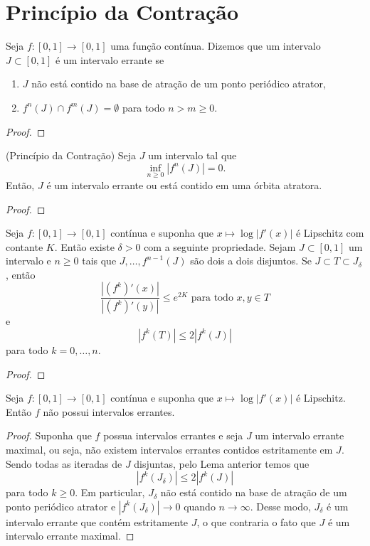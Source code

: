 \section{Princípio da Contração}

\begin{definition}
Seja $f: [0,1] \to [0,1]$ uma função contínua. Dizemos que um intervalo $J \subset [0,1]$ é um intervalo errante se
\begin{enumerate}
\item $J$ não está contido na base de atração de um ponto periódico atrator,
\item $f^n(J) \cap f^m(J) = \emptyset$ para todo $n > m \geq 0$.
\end{enumerate}

\begin{proof}

\end{proof}

\begin{lemma}(Princípio da Contração)
Seja $J$ um intervalo tal que
$$\inf_{n \geq 0} |f^n(J)| = 0.$$
Então, $J$ é um intervalo errante ou está contido em uma órbita atratora.
\end{lemma}

\begin{proof}

\end{proof}

\begin{lemma}
Seja $f: [0,1] \to [0,1]$ contínua e suponha que $x \mapsto \log |f'(x)|$ é Lipschitz com contante $K$. Então existe $\delta > 0$ com a seguinte propriedade. Sejam $J \subset [0,1]$ um intervalo e $n \geq 0$ tais que $J, \dots, f^{n-1}(J)$ são dois a dois disjuntos. Se $J \subset T \subset J_\delta$, então
$$\frac{|(f^k)'(x)|}{|(f^k)'(y)|} \leq e^{2K} \textrm{ para todo } x, y \in T$$
e
$$|f^k(T)| \leq 2 |f^k(J)|$$
para todo $k = 0, \dots, n$.
\end{lemma}

\begin{proof}

\end{proof}

\begin{corollary}
Seja $f: [0,1] \to [0,1]$ contínua e suponha que $x \mapsto \log |f'(x)|$ é Lipschitz. Então $f$ não possui intervalos errantes.
\end{corollary}

\begin{proof}
Suponha que $f$ possua intervalos errantes e seja $J$ um intervalo errante maximal, ou seja, não existem intervalos errantes contidos estritamente em $J$. Sendo todas as iteradas de $J$ disjuntas, pelo Lema anterior temos que
$$|f^k(J_\delta)| \leq 2|f^k(J)|$$
para todo $k \geq 0$. Em particular, $J_\delta$ não está contido na base de atração de um ponto periódico atrator e $|f^k(J_\delta)| \to 0$ quando $n \to \infty$. Desse modo, $J_\delta$ é um intervalo errante que contém estritamente $J$, o que contraria o fato que $J$ é um intervalo errante maximal.
\end{proof}

\end{definition}